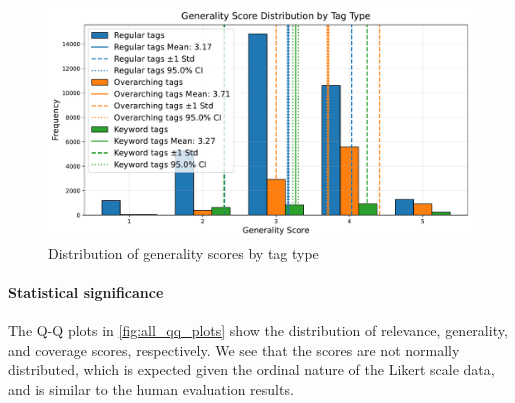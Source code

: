 \begin{figure}[h]
    \centering
    \includegraphics[width=1\textwidth]{figures/generality_distribution.pdf}
    \caption{Distribution of generality scores by tag type}
    \label{fig:gpt_tag_type_generality_distribution}
\end{figure}




\paragraph{Statistical significance}
The Q-Q plots in \cref{fig:all_qq_plots} show the distribution of relevance, generality, and coverage scores, respectively. We see that the scores are not normally distributed, which is expected given the ordinal nature of the Likert scale data, and is similar to the human evaluation results.

